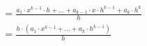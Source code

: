 \documentclass[preview]{standalone}
\begin{document}
\begin{align*}
&= \frac{a_1 \cdot x^{k-1}\cdot h + ... + a_{k-1}\cdot x\cdot h^{k-1} + a_k\cdot h^k}{h} \\ &= \frac{h \cdot (a_1\cdot x^{k-1} + ... + a_k\cdot h^{k-1})}{h}
\end{align*}
\end{document}
